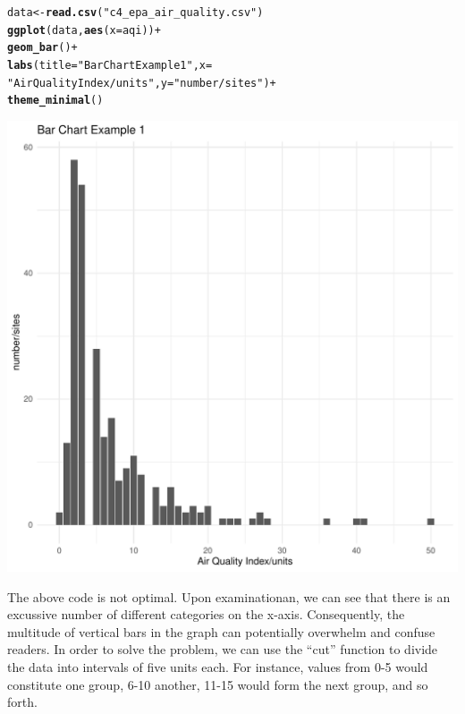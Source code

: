 \documentclass{article}\usepackage[]{graphicx}\usepackage[]{xcolor}
\makeatletter
\def\maxwidth{ %
  \ifdim\Gin@nat@width>\linewidth
    \linewidth
  \else
    \Gin@nat@width
  \fi
}
\newcommand{\hlstr}[1]{\textcolor[rgb]{0.192,0.494,0.8}{#1}}%
\newcommand{\hlopt}[1]{\textcolor[rgb]{0,0,0}{#1}}%
\newcommand{\hlstd}[1]{\textcolor[rgb]{0.345,0.345,0.345}{#1}}%
\newcommand{\hlkwb}[1]{\textcolor[rgb]{0.69,0.353,0.396}{#1}}%
\newcommand{\hlkwc}[1]{\textcolor[rgb]{0.333,0.667,0.333}{#1}}%
\newcommand{\hlkwd}[1]{\textcolor[rgb]{0.737,0.353,0.396}{\textbf{#1}}}%
\newenvironment{kframe}{%
 \def\at@end@of@kframe{}%
 \ifinner\ifhmode%
  \def\at@end@of@kframe{\end{minipage}}%
  \begin{minipage}{\columnwidth}%
 \fi\fi%
 \def\FrameCommand##1{\hskip\@totalleftmargin \hskip-\fboxsep
 \colorbox{shadecolor}{##1}\hskip-\fboxsep
     \hskip-\linewidth \hskip-\@totalleftmargin \hskip\columnwidth}%
 \MakeFramed {\advance\hsize-\width
   \@totalleftmargin\z@ \linewidth\hsize
   \@setminipage}}%
 {\par\unskip\endMakeFramed%
 \at@end@of@kframe}
\newenvironment{knitrout}{}{} %
\makeatother
\begin{document}
\begin{knitrout}
\color{fgcolor}\begin{kframe}
\begin{alltt}
\hlstd{data} \hlkwb{<-} \hlkwd{read.csv}\hlstd{(}\hlstr{"c4_epa_air_quality.csv"}\hlstd{)}
\hlkwd{ggplot}\hlstd{(data,} \hlkwd{aes}\hlstd{(}\hlkwc{x} \hlstd{= aqi))} \hlopt{+}
  \hlkwd{geom_bar}\hlstd{()} \hlopt{+}
  \hlkwd{labs}\hlstd{(}\hlkwc{title} \hlstd{=} \hlstr{"Bar Chart Example 1"}\hlstd{,} \hlkwc{x} \hlstd{=}
         \hlstr{"Air Quality Index/units"}\hlstd{,} \hlkwc{y} \hlstd{=} \hlstr{"number/sites"}\hlstd{)} \hlopt{+}
  \hlkwd{theme_minimal}\hlstd{()}
\end{alltt}
\end{kframe}
\includegraphics[width=\maxwidth]{figure/my_plot1-1} 
\end{knitrout}

The above code is not optimal. Upon examinationan, we can see that there is an excussive number of different categories on the x-axis. Consequently, the multitude of vertical bars in the graph can potentially overwhelm and confuse readers. 
In order to solve the problem, we can use the “cut” function to divide the data into intervals of five units each. For instance, values from 0-5 would constitute one group, 6-10 another, 11-15 would form the next group, and so forth.
\end{document}
